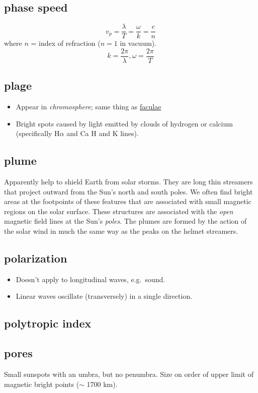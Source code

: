 \documentclass{article}
\begin{document}
\subsection{phase speed}
\[
    v_{p} = \frac{\lambda}{T} = \frac{\omega}{k} = \frac{c}{n}
    \]
where $n$ = index of refraction ($n = 1$ in vacuum).
\[
    k = \frac{2\pi}{\lambda}, \omega = \frac{2\pi}{T}
    \]

\subsection{plage}
    \begin{itemize}
        \item Appear in \emph{chromosphere}; same thing as \hyperref[ssec:facula]{faculae}
        \item Bright spots caused by light emitted by clouds of
            hydrogen or calcium (specifically H$\alpha$ and
            Ca H and K lines).
    \end{itemize}

\subsection{plume}
Apparently help to shield Earth from solar storms.
They are long thin streamers that project outward from the Sun's north and
south poles. We often find bright areas at the footpoints of these
features that are associated with small magnetic regions on the solar
surface. These structures are associated with the \emph{open} magnetic
field lines at the Sun's \emph{poles}. The plumes are formed by the action of
the solar wind in much the same way as the peaks on the helmet
streamers.
\subsection{polarization}
\begin{itemize}
    \item Doesn't apply to longitudinal waves, e.g.\ sound.
    \item Linear waves oscillate (transversely) in a single direction.
\end{itemize}

\subsection{polytropic index}

\subsection{pores}
Small sunspots with an umbra, but no penumbra.
Size on order of upper limit of magnetic bright points ($\sim$ 1700
km).
\end{document}
